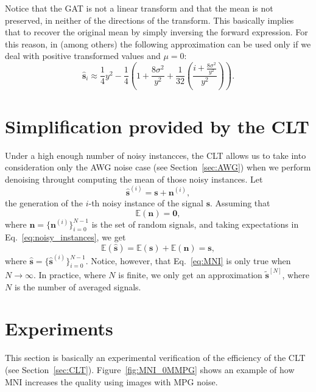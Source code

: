 Notice that the \gls{GAT} is not a linear transform and that the mean is
not preserved, in neither of the directions of the transform. This
basically implies that to recover the original mean by simply
inversing the forward expression. For this reason, in
\cite{makitalo2012optimal} (among others) the following approximation
can be used only if we deal with positive transformed values and $\mu=0$:
\begin{equation}
  \hat{\mathbf{s}}_i \approx \frac{1}{4}y^2-\frac{1}{4}\left(1+\frac{8\sigma^2}{y^2} + \frac{1}{32}\left(\frac{i+\frac{8\sigma^2}{y^2}}{y^2}\right)\right).
\end{equation}

\section{Simplification provided by the \acrshort{CLT}}
Under a high enough number of noisy instancces, the \gls{CLT} allows
us to take into consideration only the \gls{AWG} noise case (see
Section~\ref{sec:AWG}) when we perform denoising throught computing
the mean of those noisy instances. Let
\begin{equation}
  \hat{\mathbf{s}}^{(i)} = \mathbf{s} + \mathbf{n}^{(i)},
  \label{eq:noisy_instances}
\end{equation}
the generation of the $i$-th noisy instance of the
signal $\mathbf{s}$. Assuming that
\begin{equation}
  \mathbb{E}(\mathbf{n})=\mathbf{0},
\end{equation}
where $\mathbf{n}=\{\mathbf{n}^{(i)}\}_{i=0}^{N-1}$ is the set of
random signals, and taking expectations in
Eq.~\ref{eq:noisy_instances}, we get
\begin{equation}
  \mathbb{E}(\hat{\mathbf{s}}) = \mathbb{E}(\mathbf{s}) + \mathbb{E}(\mathbf{n}) = \mathbf{s},
  \label{eq:MNI}
\end{equation}
where
$\hat{\mathbf{s}}=\{\hat{\mathbf{s}}^{(i)}\}_{i=0}^{N-1}$. Notice,
however, that Eq.~\ref{eq:MNI} is only true when
$N\rightarrow\infty$. In practice, where $N$ is finite, we only get an
approximation $\tilde{\mathbf{s}}^{[N]}$, where $N$ is the number of
averaged signals.

\section{Experiments}

This section is basically an experimental verification of the
efficiency of the \gls{CLT} (see
Section~\ref{sec:CLT}). Figure~\ref{fig:MNI_0MMPG} shows an example of
how \gls{MNI} increases the quality using images with \gls{MPG} noise.
  
